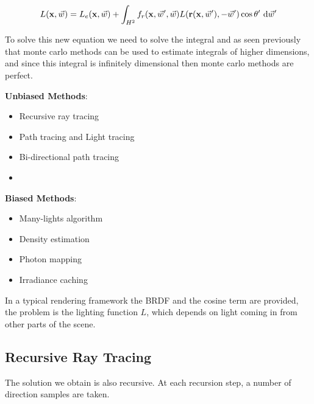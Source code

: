 \documentclass{article}
\begin{document}
\[
    L(\text{\textbf{x}}, \vec{w}) = L_e(\text{\textbf{x}}, \vec{w}) + \int_{H^2} f_r(\text{\textbf{x}}, \vec{w}', \vec{w}) L(\text{\textbf{r}}(\text{\textbf{x}}, \vec{w}'), -\vec{w}') \cos \theta' \ \text{d}\vec{w}'
\]

To solve this new equation we need to solve the integral and as seen previously that monte carlo methods can be used to estimate integrals
of higher dimensions, and since this integral is infinitely dimensional then monte carlo methods are perfect.

\vspace{10px}
\begin{center}
\begin{minipage}{0.4\textwidth}
    \textbf{Unbiased Methods}:
    \begin{itemize}
        \item Recursive ray tracing 
        \item Path tracing and Light tracing 
        \item Bi-directional path tracing
        \item[] \phantom{abba}
    \end{itemize}
\end{minipage}
\begin{minipage}{0.4\textwidth}
    \textbf{Biased Methods}:
    \begin{itemize}
        \item Many-lights algorithm 
        \item Density estimation 
        \item Photon mapping 
        \item Irradiance caching
    \end{itemize}
\end{minipage}
\end{center}

\vspace{10px}

In a typical rendering framework the BRDF and the cosine term are provided, the problem is the lighting function \(L\), which depends on
light coming in from other parts of the scene.

\newpage

\subsection{Recursive Ray Tracing}

The solution we obtain is also recursive. At each recursion step, a number of direction samples are taken.
\end{document}
